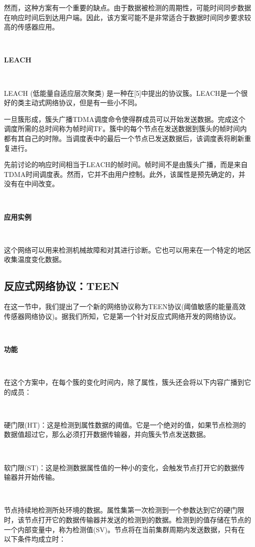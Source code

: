 \documentclass[journal]{IEEEtran}
\begin{document}
\begin{CJK}{UTF8}{gbsn}
\begin{enumerate}
\end{enumerate}

然而，这种方案有一个重要的缺点。由于数据被检测的周期性，可能时间同步数据在响应时间后到达用户端。因此，该方案可能不是非常适合于数据时间同步要求较高的传感器应用。

\

\textbf{LEACH}

\

LEACH (低能量自适应层次聚类) 是一种在[5]中提出的协议簇。LEACH是一个很好的类主动式网络协议，但是有一些小不同。

一旦簇形成，簇头广播TDMA调度命令使得群成员可以开始发送数据。完成这个调度所需的总时间称为帧时间TF。簇中的每个节点在发送数据到簇头的帧时间内都有其自己的时隙。当调度表中的最后一个节点已发送数据后，该调度表将刷新重复进行。

先前讨论的响应时间相当于LEACH的帧时间。帧时间不是由簇头广播，而是来自TDMA时间调度表。然而，它并不由用户控制。此外，该属性是预先确定的，并没有在中间改变。

\

\textbf{应用实例}

\

这个网络可以用来检测机械故障和对其进行诊断。它也可以用来在一个特定的地区收集温度变化数据。

\subsection{\textbf{反应式网络协议：TEEN}}

在这一节中，我们提出了一个新的网络协议称为TEEN协议(阈值敏感的能量高效传感器网络协议)。据我们所知，它是第一个针对反应式网络开发的网络协议。

\

\textbf{功能}

\



在这个方案中，在每个簇的变化时间内，除了属性，簇头还会将以下内容广播到它的成员：

\

硬门限(HT)：这是检测到属性数据的阈值。它是一个绝对的值，如果节点检测的数据值超过它，那么必须打开数据传输器，并向簇头节点发送数据。

\

软门限(ST)：这是检测数据属性值的一种小的变化，会触发节点打开它的数据传输器并开始传输。

\

节点持续地检测所处环境的数据。属性集第一次检测到一个参数达到它的硬门限时，该节点打开它的数据传输器并发送的检测到的数据。检测到的值存储在节点的一个内部变量中，称为检测值(SV)。节点将在当前集群周期内发送数据，只有在以下条件均成立时：


\end{CJK}
\end{document}
